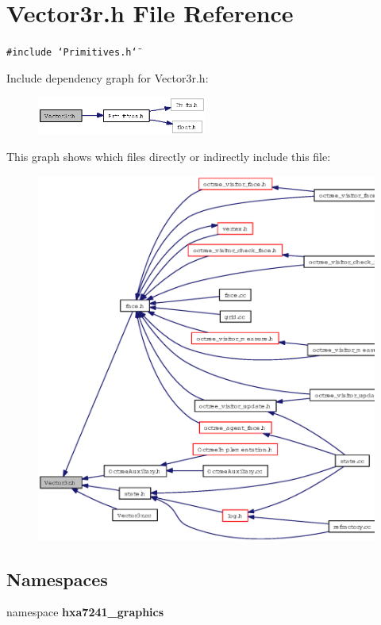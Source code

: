 \section{Vector3r.h File Reference}
\label{Vector3r_8h}
{\tt \#include \char`\"{}Primitives.h\char`\"{}}\par


Include dependency graph for Vector3r.h:\begin{figure}[H]
\begin{center}
\leavevmode
\includegraphics[width=158pt]{Vector3r_8h__incl}
\end{center}
\end{figure}


This graph shows which files directly or indirectly include this file:\begin{figure}[H]
\begin{center}
\leavevmode
\includegraphics[width=321pt]{Vector3r_8h__dep__incl}
\end{center}
\end{figure}
\subsection*{Namespaces}
\begin{CompactItemize}
\item 
namespace {\bf hxa7241\_\-graphics}
\end{CompactItemize}
